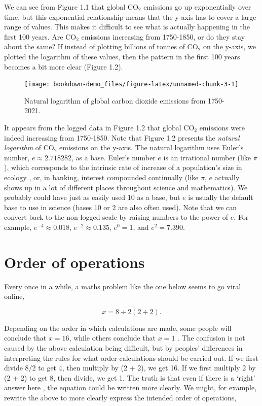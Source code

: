\documentclass[
]{scrbook}
\begin{document}
We can see from Figure 1.1 that global CO\(_{2}\) emissions go up exponentially over time, but this exponential relationship means that the y-axis has to cover a large range of values.
This makes it difficult to see what is actually happening in the first 100 years.
Are CO\(_{2}\) emissions increasing from 1750-1850, or do they stay about the same?
If instead of plotting billions of tonnes of CO\(_{2}\) on the y-axis, we plotted the logarithm of these values, then the pattern in the first 100 years becomes a bit more clear (Figure 1.2).

\begin{figure}
\texttt{[image: bookdown-demo\_files/figure-latex/unnamed-chunk-3-1]} \caption{Natural logarithm of global carbon dioxide emissions from 1750-2021.}\label{fig:unnamed-chunk-3}
\end{figure}

It appears from the logged data in Figure 1.2 that global CO\(_{2}\) emissions were indeed increasing from 1750-1850.
Note that Figure 1.2 presents the \emph{natural logarithm} of CO\(_{2}\) emissions on the y-axis.
The natural logarithm uses Euler's number, \(e \approx 2.718282\), as a base.
Euler's number \(e\) is an irrational number (like \(\pi\)), which corresponds to the intrinsic rate of increase of a population's size in ecology \citep{Gotelli2001}, or, in banking, interest compounded continually (like \(\pi\), \(e\) actually shows up in a lot of different places throughout science and mathematics).
We probably could have just as easily used 10 as a base, but \(e\) is usually the default base to use in science (bases 10 or 2 are also often used).
Note that we can convert back to the non-logged scale by raising numbers to the power of \(e\).
For example, \(e^{-4} \approx 0.018\), \(e^{-2} \approx 0.135\), \(e^{0} = 1\), and \(e^{2} = 7.390\).

\hypertarget{order-of-operations}{%
\section{Order of operations}\label{order-of-operations}}

Every once in a while, a maths problem like the one below seems to go viral online,

\[x = 8 \div 2\left(2+2\right).\]

Depending on the order in which calculations are made, some people will conclude that \(x = 16\), while others conclude that \(x = 1\) \citep{Chernoff2022}.
The confusion is not caused by the above calculation being difficult, but by peoples' differences in interpreting the rules for what order calculations should be carried out.
If we first divide 8/2 to get 4, then multiply by (2 + 2), we get 16.
If we first multiply 2 by (2 + 2) to get 8, then divide, we get 1.
The truth is that even if there is a `right' answer here \citep{Chernoff2022}, the equation could be written more clearly.
We might, for example, rewrite the above to more clearly express the intended order of operations,
\end{document}
